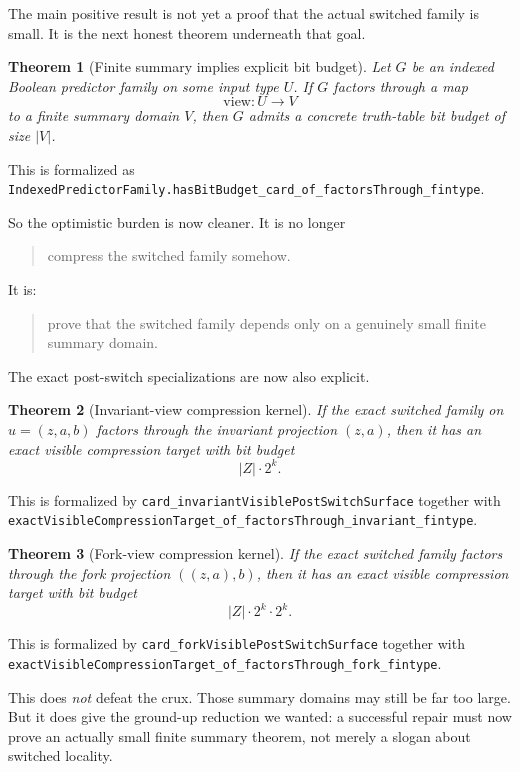 \documentclass[11pt]{article}
\newtheorem{theorem}{Theorem}[section]
\theoremstyle{remark}
\begin{document}
The main positive result is not yet a proof that the actual switched family is
small.  It is the next honest theorem underneath that goal.

\begin{theorem}[Finite summary implies explicit bit budget]
Let \(G\) be an indexed Boolean predictor family on some input type \(U\).  If
\(G\) factors through a map
\[
  \mathrm{view} : U \to V
\]
to a finite summary domain \(V\), then \(G\) admits a concrete truth-table bit
budget of size \(|V|\).
\end{theorem}

\noindent
This is formalized as
\texttt{IndexedPredictorFamily.hasBitBudget\_card\_of\_factorsThrough\_fintype}.

So the optimistic burden is now cleaner.  It is no longer
\begin{quote}
compress the switched family somehow.
\end{quote}
It is:
\begin{quote}
prove that the switched family depends only on a genuinely small finite summary
domain.
\end{quote}

The exact post-switch specializations are now also explicit.

\begin{theorem}[Invariant-view compression kernel]
If the exact switched family on \(u=(z,a,b)\) factors through the invariant
projection \((z,a)\), then it has an exact visible compression target with bit
budget
\[
  |Z| \cdot 2^k.
\]
\end{theorem}

\noindent
This is formalized by
\texttt{card\_invariantVisiblePostSwitchSurface} together with
\texttt{exactVisibleCompressionTarget\_of\_factorsThrough\_invariant\_fintype}.

\begin{theorem}[Fork-view compression kernel]
If the exact switched family factors through the fork projection
\(((z,a),b)\), then it has an exact visible compression target with bit budget
\[
  |Z| \cdot 2^k \cdot 2^k.
\]
\end{theorem}

\noindent
This is formalized by
\texttt{card\_forkVisiblePostSwitchSurface} together with
\texttt{exactVisibleCompressionTarget\_of\_factorsThrough\_fork\_fintype}.

This does \emph{not} defeat the crux.  Those summary domains may still be far
too large.  But it does give the ground-up reduction we wanted: a successful
repair must now prove an actually small finite summary theorem, not merely a
slogan about switched locality.
\end{document}
